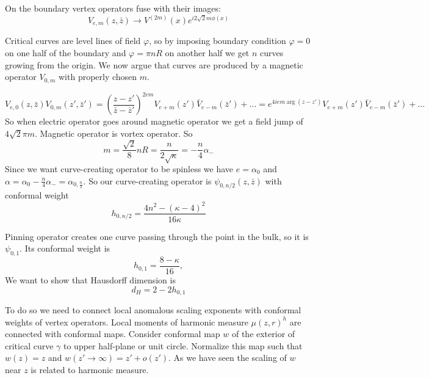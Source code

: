 \documentclass[12pt]{article}
\begin{document}
On the boundary vertex operators fuse with their images:
\begin{equation}
  \label{eq:144}
    V_{e,m}(z,\bar z)\to V^{(2m)}(x) e^{i 2\sqrt{2}m \phi(x)}
\end{equation}

Critical curves are level lines of field $\varphi$, so by imposing boundary condition $\varphi=0$
on one half of the boundary and $\varphi=\pi n R$ on another half we get $n$ curves growing from the
origin. We now argue that curves are produced by a magnetic operator $V_{0,m}$ with properly chosen
$m$. 

\begin{equation}
  \label{eq:145}
  V_{e,0}(z,\bar z)V_{0,m}(z',\bar z')=\left(\frac{z-z'}{\bar z-\bar z'}\right)^{2em}
  V_{e+m}(z')\bar V_{e-m}(\bar z')+\dots=e^{4i em \arg(z-z')} V_{e+m}(z')\bar V_{e-m}(\bar z')+\dots
\end{equation}
So when electric operator goes around magnetic operator we get a field jump of $4\sqrt{2}\pi m$.
Magnetic operator is vortex operator. So
\begin{equation}
  \label{eq:146}
  m=\frac{\sqrt{2}}{8}nR = \frac{n}{2\sqrt{\kappa}}=-\frac{n}{4} \alpha_{-}
\end{equation}
Since we want curve-creating operator to be spinless we have $e=\alpha_{0}$ and
$\alpha=\alpha_{0}-\frac{n}{4}\alpha_{-}=\alpha_{0,\frac{n}{2}}$. So our curve-creating operator is
$\psi_{0,n/2}(z,\bar z)$ with conformal weight
\begin{equation}
  \label{eq:147}
  h_{0,n/2}=\frac{4n^{2}-(\kappa-4)^{2}}{16\kappa}
\end{equation}

Pinning operator creates one curve passing through the point in the bulk, so it is $\psi_{0,1}$. Its
conformal weight is
\begin{equation}
  \label{eq:148}
  h_{0,1}=\frac{8-\kappa}{16},
\end{equation}
We want to show that Hausdorff dimension is
\begin{equation}
  \label{eq:149}
  d_{H}=2-2h_{0,1}
\end{equation}

To do so we need to connect local anomalous scaling exponents with conformal weights of vertex
operators. Local moments of harmonic measure $\mu(z,r)^{h}$ are connected with conformal maps.
Consider conformal map $w$ of the exterior of critical curve $\gamma$ to upper half-plane or unit
circle. Normalize this map such that $w(z)=z$ and $w(z'\to\infty)=z'+o(z')$. As we have seen the
scaling of $w$ near $z$ is related to harmonic measure.
\end{document}
